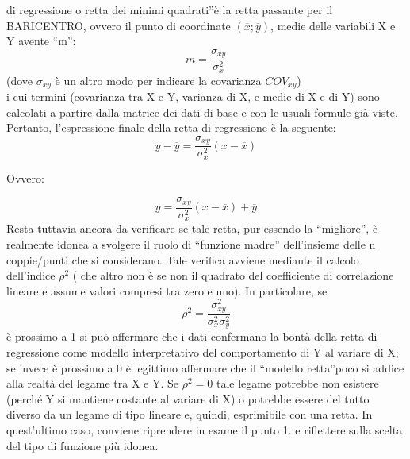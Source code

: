 di regressione  o retta dei minimi quadrati\textquotedblright è la retta 
passante per il BARICENTRO, ovvero il punto di coordinate 
$(\overline{x};\overline{y})$, medie delle variabili X e Y avente 
\textquotedblleft m\textquotedblright:
 $$m=\frac{\sigma_{xy}}{\sigma^2_{x}}$$
 (dove $\sigma_{xy}$ è un altro modo per indicare la covarianza 
$COV_{xy}$)\\
 i cui termini (covarianza tra X e Y, varianza di X, e medie di X e di Y) 
sono calcolati a partire dalla matrice dei dati di base e con le usuali 
formule già viste.
 Pertanto, l'espressione finale della retta di regressione è la seguente:
 $$y-\overline{y}=\frac{\sigma_{xy}}{\sigma^2_{x}}(x-\overline{x})$$
 \begin{center}
        Ovvero: 
 \end{center}
 $$y=\frac{\sigma_{xy}}{\sigma^2_{x}}(x-\overline{x})+\overline{y}$$
 Resta tuttavia ancora da verificare se tale retta, pur essendo la 
\textquotedblleft migliore\textquotedblright,  è realmente idonea a 
svolgere il ruolo di \textquotedblleft funzione madre\textquotedblright 
dell'insieme delle n coppie/punti che si considerano. Tale verifica avviene 
mediante il calcolo dell'indice $\rho^2$ ( che altro non è se non il 
quadrato del coefficiente di correlazione lineare e assume valori compresi 
tra zero e uno).
 In particolare,  se
 $$\rho^2=\frac{\sigma^2_{xy}}{\sigma^2_{x}\sigma^2_{y}}$$
 è prossimo a 1 si può affermare che i dati confermano la bontà della  
retta di regressione  come modello interpretativo del comportamento di Y al 
variare di X; se invece è prossimo a 0 è legittimo affermare che il 
\textquotedblleft modello retta\textquotedblright poco si addice alla 
realtà del legame tra X e Y.  Se $\rho^2=0$ tale legame potrebbe non 
esistere (perché Y si mantiene costante al variare di X) o potrebbe essere 
del tutto diverso da un legame di tipo lineare e, quindi, esprimibile con 
una retta. In quest'ultimo caso, conviene riprendere in esame il punto 1. e 
riflettere sulla scelta del tipo di funzione più idonea.
